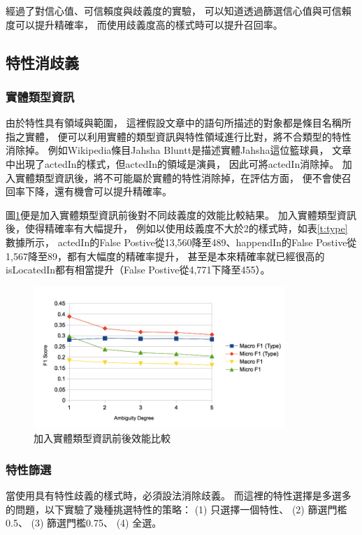 經過了對信心值、可信賴度與歧義度的實驗，
可以知道透過篩選信心值與可信賴度可以提升精確率，
而使用歧義度高的樣式時可以提升召回率。

\subsection{特性消歧義}
\subsubsection{實體類型資訊}
由於特性具有領域與範圍，
這裡假設文章中的語句所描述的對象都是條目名稱所指之實體，
便可以利用實體的類型資訊與特性領域進行比對，將不合類型的特性消除掉。
例如Wikipedia條目Jahsha Bluntt是描述實體Jahsha這位籃球員，
文章中出現了actedIn的樣式，但actedIn的領域是演員，
因此可將actedIn消除掉。
加入實體類型資訊後，將不可能屬於實體的特性消除掉，在評估方面，
便不會使召回率下降，還有機會可以提升精確率。

圖\ref{i:type}便是加入實體類型資訊前後對不同歧義度的效能比較結果。
加入實體類型資訊後，使得精確率有大幅提升，
例如以使用歧義度不大於2的樣式時，如表\ref{t:type} 數據所示，
actedIn的False Postive從13,560降至489、happendIn的False Postive從1,567降至89，都有大幅度的精確率提升，
甚至是本來精確率就已經很高的isLocatedIn都有相當提升（False Postive從4,771下降至455）。

\begin{figure}[h]
    \centering
    \includegraphics[width=0.85\textwidth]{images/04-type}
    \caption{加入實體類型資訊前後效能比較}
    \label{i:type}
\end{figure}



\subsubsection{特性篩選}
當使用具有特性歧義的樣式時，必須設法消除歧義。
而這裡的特性選擇是多選多的問題，以下實驗了幾種挑選特性的策略：
(1) 只選擇一個特性、 (2) 篩選門檻0.5、 (3) 篩選門檻0.75、 (4) 全選。

